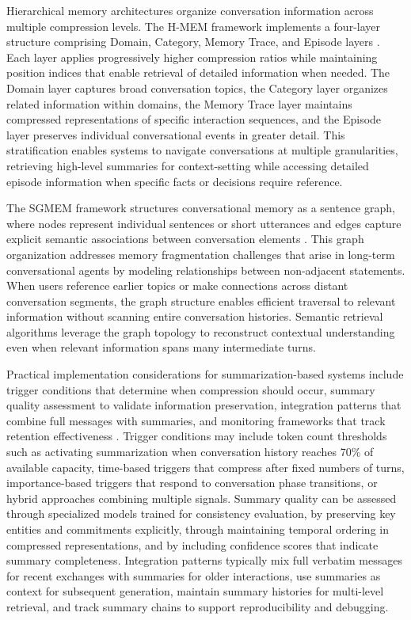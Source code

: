 \documentclass[11pt,letterpaper]{article}
\begin{document}
Hierarchical memory architectures organize conversation information across multiple compression levels. The H-MEM framework implements a four-layer structure comprising Domain, Category, Memory Trace, and Episode layers \cite{wang2024hmem}. Each layer applies progressively higher compression ratios while maintaining position indices that enable retrieval of detailed information when needed. The Domain layer captures broad conversation topics, the Category layer organizes related information within domains, the Memory Trace layer maintains compressed representations of specific interaction sequences, and the Episode layer preserves individual conversational events in greater detail. This stratification enables systems to navigate conversations at multiple granularities, retrieving high-level summaries for context-setting while accessing detailed episode information when specific facts or decisions require reference.

The SGMEM framework structures conversational memory as a sentence graph, where nodes represent individual sentences or short utterances and edges capture explicit semantic associations between conversation elements \cite{liu2024sgmem}. This graph organization addresses memory fragmentation challenges that arise in long-term conversational agents by modeling relationships between non-adjacent statements. When users reference earlier topics or make connections across distant conversation segments, the graph structure enables efficient traversal to relevant information without scanning entire conversation histories. Semantic retrieval algorithms leverage the graph topology to reconstruct contextual understanding even when relevant information spans many intermediate turns.

Practical implementation considerations for summarization-based systems include trigger conditions that determine when compression should occur, summary quality assessment to validate information preservation, integration patterns that combine full messages with summaries, and monitoring frameworks that track retention effectiveness \cite{ibrahim2025strategies}. Trigger conditions may include token count thresholds such as activating summarization when conversation history reaches 70\% of available capacity, time-based triggers that compress after fixed numbers of turns, importance-based triggers that respond to conversation phase transitions, or hybrid approaches combining multiple signals. Summary quality can be assessed through specialized models trained for consistency evaluation, by preserving key entities and commitments explicitly, through maintaining temporal ordering in compressed representations, and by including confidence scores that indicate summary completeness. Integration patterns typically mix full verbatim messages for recent exchanges with summaries for older interactions, use summaries as context for subsequent generation, maintain summary histories for multi-level retrieval, and track summary chains to support reproducibility and debugging.
\end{document}
